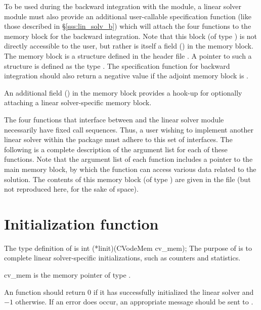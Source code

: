 \vspace{0.1in}
To be used during the backward integration with the {\cvodea} module, a linear solver module 
must also provide an additional user-callable specification function (like those described in
\S\ref{sss:lin_solv_b}) which will attach the four functions to the {\cvodes} memory block for the
backward integration. Note that this block (of type ) is not
directly accessible to the user, but rather is itself a field () in the {\cvodea}
memory block. 
The {\cvodea} memory block is a structure defined in the header file . 
A pointer to such a structure is defined as the type .
The specification function for backward integration should also return a negative value
if the adjoint {\cvodea} memory block is .

An additional field () in the {\cvodea} memory block provides a hook-up for
optionally attaching a linear solver-specific memory block.

\vspace{0.1in}
The four functions that interface between {\cvodes} and the linear solver module
necessarily have fixed call sequences.  Thus, a user wishing to implement another 
linear solver within the {\cvodes} package must adhere to this set of interfaces.
The following is a complete description of the argument list for each of
these functions.  Note that the argument list of each function includes a
pointer to the main {\cvodes} memory block, by which the function can access
various data related to the {\cvodes} solution.  The contents of this memory
block (of type ) are given in the file  
(but not reproduced here, for the sake of space).


\section{Initialization function}
The type definition of  is
{
  int (*linit)(CVodeMem cv\_mem);
}
{
  The purpose of  is to complete linear solver-specific initializations,
  such as counters and statistics.        
}
{
  \begin{args}[cv\_mem]
  \item[cv\_mem]
    is the {\cvodes} memory pointer of type .
  \end{args}
}
{
  An  function should return $0$ if it 
  has successfully initialized the {\cvodes} linear solver and 
  $-1$ otherwise. 
}
{
  If an error does occur, an appropriate message should be sent 
  to .
}

